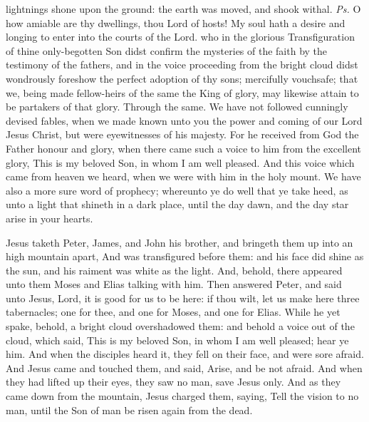 \introit
{} lightnings shone upon the ground: the earth was moved, and shook withal. \textit{Ps.} O how amiable are thy dwellings, thou Lord of hosts! My soul hath a desire and longing to enter into the courts of the Lord.
\collect
{} who in the glorious Transfiguration of thine only-begotten Son didst confirm the mysteries of the faith by the testimony of the fathers, and in the voice proceeding from the bright cloud didst wondrously foreshow the perfect adoption of thy sons; mercifully vouchsafe; that we, being made fellow-heirs of the same the King of glory, may likewise attain to be partakers of that glory. Through the same.
 We have not followed cunningly devised fables, when we made known unto you the power and coming of our Lord Jesus Christ, but were eyewitnesses of his majesty. For he received from God the Father honour and glory, when there came such a voice to him from the excellent glory, This is my beloved Son, in whom I am well pleased. And this voice which came from heaven we heard, when we were with him in the holy mount. We have also a more sure word of prophecy; whereunto ye do well that ye take heed, as unto a light that shineth in a dark place, until the day dawn, and the day star arise in your hearts.


 Jesus taketh Peter, James, and John his brother, and bringeth them up into an high mountain apart, And was transfigured before them: and his face did shine as the sun, and his raiment was white as the light. And, behold, there appeared unto them Moses and Elias talking with him. Then answered Peter, and said unto Jesus, Lord, it is good for us to be here: if thou wilt, let us make here three tabernacles; one for thee, and one for Moses, and one for Elias. While he yet spake, behold, a bright cloud overshadowed them: and behold a voice out of the cloud, which said, This is my beloved Son, in whom I am well pleased; hear ye him. And when the disciples heard it, they fell on their face, and were sore afraid. And Jesus came and touched them, and said, Arise, and be not afraid. And when they had lifted up their eyes, they saw no man, save Jesus only. And as they came down from the mountain, Jesus charged them, saying, Tell the vision to no man, until the Son of man be risen again from the dead.

